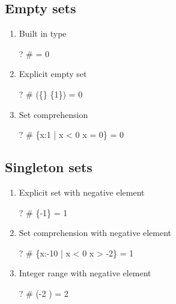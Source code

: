 \documentclass{article}
\newcommand{\negate}{-}
\begin{document}
\subsection{Empty sets}
\begin{enumerate}
\item Built in type
\begin{zed} \vdash?  \# \emptyset[\nat] = 0 \end{zed}
\item Explicit empty set
\begin{zed} \vdash?  \# (\{\} \setminus \{1\}) = 0 \end{zed}
\item Set comprehension
\begin{zed} \vdash?  \# \{x:1  | x < 0 \land x = 0\} = 0 \end{zed}
\end{enumerate}

\subsection{Singleton sets}
\begin{enumerate}
\item Explicit set with negative element
\begin{zed} \vdash?  \# \{\negate 1\} = 1 \end{zed}
\item Set comprehension with negative element
\begin{zed} \vdash?  \# \{x:\negate 10 \upto \negate 1 | x < 0 \land x > \negate 2\} = 1 \end{zed}
\item Integer range with negative element
\begin{zed} \vdash?  \# (\negate 2 \upto \negate 1) = 2 \end{zed}
\end{enumerate}
\end{document}
